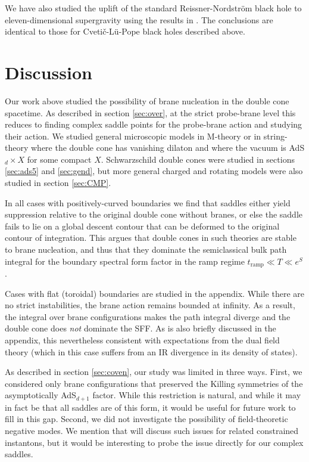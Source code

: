 \documentclass[11pt]{article}
\begin{document}
We have also studied the  uplift of the standard Reissner-Nordstr\"om black hole to eleven-dimensional supergravity using the results in \cite{Chamblin:1999tk}. The conclusions are identical to those for Cveti\v{c}-L\"u-Pope black holes described above.



\section{Discussion} \label{sec:disc}

Our work above studied the possibility of brane nucleation in the double cone spacetime.
As described in section \ref{sec:over}, at the strict probe-brane level this reduces to finding complex saddle points for the probe-brane action and studying their action.
We studied general microscopic models in M-theory or in string-theory where the double cone has vanishing dilaton and where the vacuum is AdS$_d\times X$ for some compact $X$.
Schwarzschild double cones were studied in sections \ref{sec:ads5} and \ref{sec:gend}, but more general charged and rotating models were also studied in section \ref{sec:CMP}.

In all cases with positively-curved boundaries we find that saddles either yield suppression relative to the original double cone without branes, or else the saddle fails to lie on a global descent contour that can be deformed to the original contour of integration.
This argues that double cones in such theories are stable to brane nucleation, and thus that they dominate the semiclassical bulk path integral for the boundary spectral form factor in the ramp regime $t_{\text{ramp}} \ll T \ll e^{S}$.

Cases with flat (toroidal) boundaries are studied in the appendix.  
While there are no strict instabilities, the brane action remains bounded at infinity.  
As a result, the integral over brane configurations makes the path integral diverge and the double cone does {\it not} dominate the SFF. 
As is also briefly discussed in the appendix, this nevertheless consistent with expectations from the dual field theory (which in this case suffers from an IR divergence in its density of states).

As described in section \ref{sec:coven}, our study was limited in three ways.
First, we considered only brane configurations that preserved the Killing symmetries of the asymptotically AdS$_{d+1}$ factor.
While this restriction is natural, and while it may in fact be that all saddles are of this form, it would be useful for future work to fill in this gap.
Second, we did not investigate the possibility of field-theoretic negative modes.
We mention that \cite{CJnew} will discuss such issues for related constrained instantons, but it would be interesting to probe the issue directly for our complex saddles.
\end{document}

